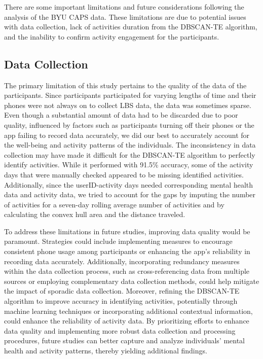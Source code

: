 \documentclass[
  letterpaper,
  number,
  review,
  3p]{elsarticle}
\begin{document}
There are some important limitations and future considerations following
the analysis of the BYU CAPS data. These limitations are due to
potential issues with data collection, lack of activities duration from
the DBSCAN-TE algorithm, and the inability to confirm activity
engagement for the participants.

\subsection{Data Collection}\label{data-collection}

The primary limitation of this study pertains to the quality of the data
of the participants. Since participants participated for varying lengths
of time and their phones were not always on to collect LBS data, the
data was sometimes sparse. Even though a substantial amount of data had
to be discarded due to poor quality, influenced by factors such as
participants turning off their phones or the app failing to record data
accurately, we did our best to accurately account for the well-being and
activity patterns of the individuals. The inconsistency in data
collection may have made it difficult for the DBSCAN-TE algorithm to
perfectly identify activities. While it performed with 91.5\% accuracy,
some of the activity days that were manually checked appeared to be
missing identified activities. Additionally, since the userID-activity
days needed corresponding mental health data and activity data, we tried
to account for the gaps by imputing the number of activities for a
seven-day rolling average number of activities and by calculating the
convex hull area and the distance traveled.

To address these limitations in future studies, improving data quality
would be paramount. Strategies could include implementing measures to
encourage consistent phone usage among participants or enhancing the
app's reliability in recording data accurately. Additionally,
incorporating redundancy measures within the data collection process,
such as cross-referencing data from multiple sources or employing
complementary data collection methods, could help mitigate the impact of
sporadic data collection. Moreover, refining the DBSCAN-TE algorithm to
improve accuracy in identifying activities, potentially through machine
learning techniques or incorporating additional contextual information,
could enhance the reliability of activity data. By prioritizing efforts
to enhance data quality and implementing more robust data collection and
processing procedures, future studies can better capture and analyze
individuals' mental health and activity patterns, thereby yielding
additional findings.
\end{document}
